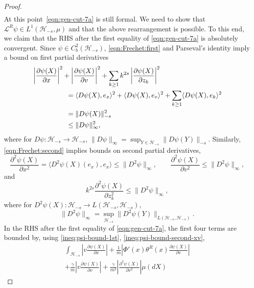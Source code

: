 \documentclass[11pt]{amsart}
\theoremstyle{definition}
\renewcommand{\L}{\mathcal{L}}
\renewcommand{\H}{\mathcal{H}}
\newcommand{\la}{\langle}
\newcommand{\ra}{\rangle}
\newcommand{\Hs}{\mathcal{H}_{-s}}
\theoremstyle{definition}
\theoremstyle{plain}
\numberwithin{equation}{section}
\begin{document}
\begin{proof}
\begin{equation}
\begin{aligned}
\end{aligned}
\end{equation}
At this point~\eqref{eqn:gen-cut-7a} is still formal. We need to show that $\L^R\psi\in L^1(\Hs,\mu)$ and that the above rearrangement is possible. To this end, we claim that the RHS after the first equality of \eqref{eqn:gen-cut-7a} is absolutely convergent. Since $\psi\in C^2_b(\H_{-s})$, \eqref{eqn:Frechet:first} and Parseval's identity  imply a bound on first partial derivatives
\begin{equation}\label{ineq:psi-bound-1st}
\begin{aligned}
\MoveEqLeft[5] \left|\frac{\partial \psi(X)}{\partial x}\right|^2+\left|\frac{\partial \psi(X)}{\partial v}\right|^2+\sum_{k\geq 1}k^{2s}\left|\frac{\partial \psi(X)}{\partial z_k}\right|^2 \\
&=\la D\psi(X),e_x\ra ^2+\la D\psi(X),e_v\ra^2+\sum_{k\geq 1}\la D\psi(X),e_k\ra^2\\
&=\| D\psi(X)\|_{-s}^2\\
&\leq\| D\psi\|_\infty^2,
\end{aligned}
\end{equation} 
where for $ D\psi:\Hs\to\Hs$, $\| D\psi\|_\infty=\sup_{Y\in\Hs}\| D\psi(Y)\|_{-s}$. Similarly, \eqref{eqn:Frechet:second} implies bounds on second partial derivatives,
\begin{equation}\label{ineq:psi-bound-second-xv}
\frac{\partial^2\psi\left(X \right)}{\partial x^2}=\la D^2\psi(X)(e_x),e_x\ra\leq \| D^2\psi\|_{\infty},\qquad \frac{\partial^2\psi\left(X \right)}{\partial v^2}\leq \| D^2\psi\|_{\infty},
\end{equation}
and
\begin{equation}\label{ineq:psi-bound-second-z}
k^{2s}\frac{\partial^2\psi\left(X \right)}{\partial z_k^2}\leq \| D^2\psi\|_{\infty},
\end{equation}
where for $ D^2\psi(X):\Hs\to L(\Hs,\Hs)$, 
\begin{displaymath}
\| D^2\psi\|_{\infty}=\sup_{\Hs}\| D^2\psi(Y)\|_{L(\Hs,\Hs)}.
\end{displaymath} 
In the RHS after the first equality of \eqref{eqn:gen-cut-7a}, the first four terms are bounded by, using \eqref{ineq:psi-bound-1st}, \eqref{ineq:psi-bound-second-xv},
\begin{multline}\label{ineq:gen-cut-8a}
\int_{\mathcal{H}_{-s}} \left| v\frac{\partial \psi(X)}{\partial x}\right|+\frac{1}{m}\left|\Phi'(x)\theta^R(x)\frac{\partial \psi(X)}{\partial v}\right|\\+ \frac{\gamma}{m}\left|v\frac{\partial \psi(X)}{\partial v}\right|+\frac{\gamma}{m^2}\left|\frac{\partial ^2\psi(X)}{\partial v^2}\right|\mu(dX)

\end{multline}
\end{proof}
\end{document}
